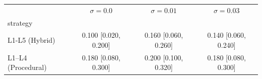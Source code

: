\begin{tabular}{lccc}
\toprule
 & $\sigma=0.0$ & $\sigma=0.01$ & $\sigma=0.03$ \\
strategy &  &  &  \\
\midrule
L1-L5 (Hybrid) & 0.100 [0.020, 0.200] & 0.160 [0.060, 0.260] & 0.140 [0.060, 0.240] \\
L1–L4 (Procedural) & 0.180 [0.080, 0.300] & 0.200 [0.100, 0.320] & 0.180 [0.080, 0.300] \\
\bottomrule
\end{tabular}
